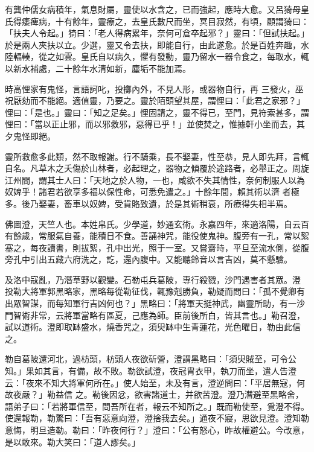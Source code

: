 \begin{pinyinscope}
 有龔仲儒女病積年，氣息財屬，靈使以水含之，已而強起，應時大愈。又呂猗母皇氏得痿痺病，十有餘年，靈療之，去皇氏數尺而坐，冥目寂然，有頃，顧謂猗曰：「扶夫人令起。」猗曰：「老人得病累年，奈何可倉卒起邪？」靈曰：「但試扶起。」於是兩人夾扶以立。少選，靈又令去扶，即能自行，由此遂愈。於是百姓奔趣，水陸輻輳，從之如雲。皇氏自以病久，懼有發動，靈乃留水一器令食之，每取水，輒以新水補處，二十餘年水清如新，塵垢不能加焉。



 時高悝家有鬼怪，言語訶叱，投擲內外，不見人形，或器物自行，再
 三發火，巫祝厭劾而不能絕。適值靈，乃要之。靈於陌頭望其屋，謂悝曰：「此君之家邪？」悝曰：「是也。」靈曰：「知之足矣。」悝固請之，靈不得已，至門，見符索甚多，謂悝曰：「當以正止邪，而以邪救邪，惡得已乎！」並使焚之，惟據軒小坐而去，其夕鬼怪即絕。



 靈所救愈多此類，然不取報謝。行不騎乘，長不娶妻，性至恭，見人即先拜，言輒自名。凡草木之夭傷於山林者，必起理之，器物之傾覆於途路者，必舉正之。周旋江州間，謂其士人曰：「天地之於人物，一也，咸欲不失其情性，奈何制服人以為奴婢乎！諸君若欲享多福以保性命，可悉免遣之。」十餘年間，賴其術以濟
 者極多。後乃娶妻，畜車以奴婢，受貨賂致遺，於是其術稍衰，所療得失相半焉。



 佛圖澄，天竺人也。本姓帛氏。少學道，妙通玄術。永嘉四年，來適洛陽，自云百有餘歲，常服氣自養，能積日不食。善誦神咒，能役使鬼神。腹旁有一孔，常以絮塞之，每夜讀書，則拔絮，孔中出光，照于一室。又嘗齋時，平旦至流水側，從腹旁孔中引出五藏六府洗之，訖，還內腹中。又能聽鈴音以言吉凶，莫不懸驗。



 及洛中寇亂，乃潛草野以觀變。石勒屯兵葛陂，專行殺戮，沙門遇害者其眾。澄
 投勒大將軍郭黑略家，黑略每從勒征伐，輒豫剋勝負，勒疑而問曰：「孤不覺卿有出眾智謀，而每知軍行吉凶何也？」黑略曰：「將軍天挺神武，幽靈所助，有一沙門智術非常，云將軍當略有區夏，己應為師。臣前後所白，皆其言也。」勒召澄，試以道術。澄即取缽盛水，燒香咒之，須臾缽中生青蓮花，光色曜日，勒由此信之。



 勒自葛陂還河北，過枋頭，枋頭人夜欲斫營，澄謂黑略曰：「須臾賊至，可令公知。」果如其言，有備，故不敗。勒欲試澄，夜冠胄衣甲，執刀而坐，遣人告澄云：「夜來不知大將軍何所在。」使人始至，未及有言，澄逆問曰：「平居無寇，何故夜嚴？」勒益信
 之。勒後因忿，欲害諸道士，并欲苦澄。澄乃潛避至黑略舍，語弟子曰：「若將軍信至，問吾所在者，報云不知所之。」既而勒使至，覓澄不得。使還報勒，勒驚曰：「吾有惡意向澄，澄捨我去矣。」通夜不寢，思欲見澄。澄知勒意悔，明旦造勒。勒曰：「昨夜何行？」澄曰：「公有怒心，昨故權避公。今改意，是以敢來。勒大笑曰：「道人謬矣。」




\end{pinyinscope}
